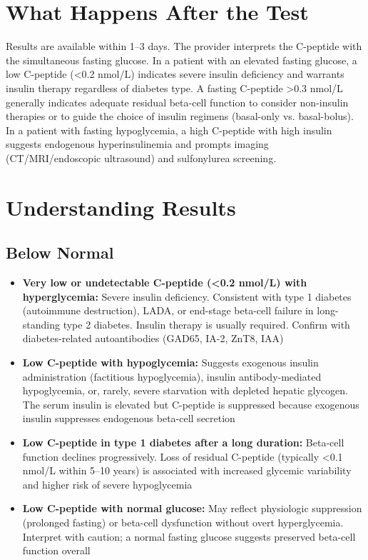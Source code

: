 \section*{What Happens After the Test}
Results are available within 1--3 days. The provider interprets the C-peptide with the simultaneous fasting glucose. In a patient with an elevated fasting glucose, a low C-peptide (<0.2 nmol/L) indicates severe insulin deficiency and warrants insulin therapy regardless of diabetes type. A fasting C-peptide >0.3 nmol/L generally indicates adequate residual beta-cell function to consider non-insulin therapies or to guide the choice of insulin regimens (basal-only vs. basal-bolus). In a patient with fasting hypoglycemia, a high C-peptide with high insulin suggests endogenous hyperinsulinemia and prompts imaging (CT/MRI/endoscopic ultrasound) and sulfonylurea screening.

\section*{Understanding Results}

\subsection*{Below Normal}
\begin{itemize}
  \item \textbf{Very low or undetectable C-peptide (<0.2 nmol/L) with hyperglycemia:} Severe insulin deficiency. Consistent with type 1 diabetes (autoimmune destruction), LADA, or end-stage beta-cell failure in long-standing type 2 diabetes. Insulin therapy is usually required. Confirm with diabetes-related autoantibodies (GAD65, IA-2, ZnT8, IAA)
  \item \textbf{Low C-peptide with hypoglycemia:} Suggests exogenous insulin administration (factitious hypoglycemia), insulin antibody-mediated hypoglycemia, or, rarely, severe starvation with depleted hepatic glycogen. The serum insulin is elevated but C-peptide is suppressed because exogenous insulin suppresses endogenous beta-cell secretion
  \item \textbf{Low C-peptide in type 1 diabetes after a long duration:} Beta-cell function declines progressively. Loss of residual C-peptide (typically <0.1 nmol/L within 5--10 years) is associated with increased glycemic variability and higher risk of severe hypoglycemia
  \item \textbf{Low C-peptide with normal glucose:} May reflect physiologic suppression (prolonged fasting) or beta-cell dysfunction without overt hyperglycemia. Interpret with caution; a normal fasting glucose suggests preserved beta-cell function overall
\end{itemize}

